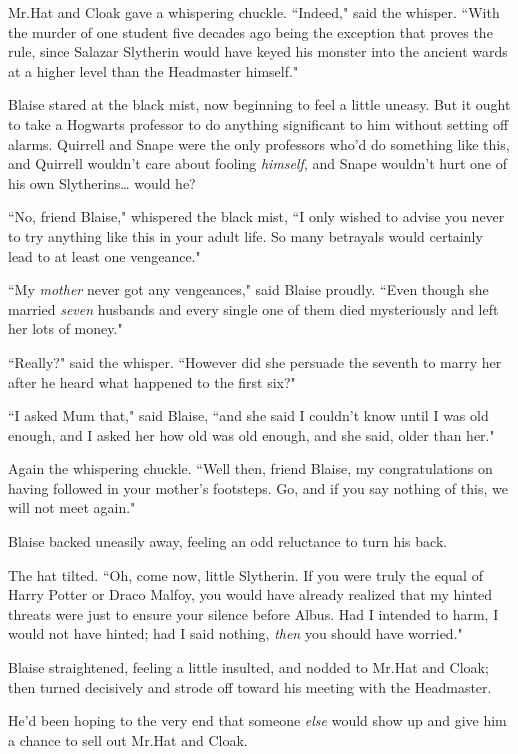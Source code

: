 Mr.\?Hat and Cloak gave a whispering chuckle. ``Indeed," said the whisper. ``With the murder of one student five decades ago being the exception that proves the rule, since Salazar Slytherin would have keyed his monster into the ancient wards at a higher level than the Headmaster himself."

Blaise stared at the black mist, now beginning to feel a little uneasy. But it ought to take a Hogwarts professor to do anything significant to him without setting off alarms. Quirrell and Snape were the only professors who'd do something like this, and Quirrell wouldn't care about fooling \emph{himself}, and Snape wouldn't hurt one of his own Slytherins{\ldots} would he?

``No, friend Blaise," whispered the black mist, ``I only wished to advise you never to try anything like this in your adult life. So many betrayals would certainly lead to at least one vengeance."

``My \emph{mother} never got any vengeances," said Blaise proudly. ``Even though she married \emph{seven} husbands and every single one of them died mysteriously and left her lots of money."

``Really?" said the whisper. ``However did she persuade the seventh to marry her after he heard what happened to the first six?"

``I asked Mum that," said Blaise, ``and she said I couldn't know until I was old enough, and I asked her how old was old enough, and she said, older than her."

Again the whispering chuckle. ``Well then, friend Blaise, my congratulations on having followed in your mother's footsteps. Go, and if you say nothing of this, we will not meet again."

Blaise backed uneasily away, feeling an odd reluctance to turn his back.

The hat tilted. ``Oh, come now, little Slytherin. If you were truly the equal of Harry Potter or Draco Malfoy, you would have already realized that my hinted threats were just to ensure your silence before Albus. Had I intended to harm, I would not have hinted; had I said nothing, \emph{then} you should have worried."

Blaise straightened, feeling a little insulted, and nodded to Mr.\?Hat and Cloak; then turned decisively and strode off toward his meeting with the Headmaster.

He'd been hoping to the very end that someone \emph{else} would show up and give him a chance to sell out Mr.\?Hat and Cloak.

